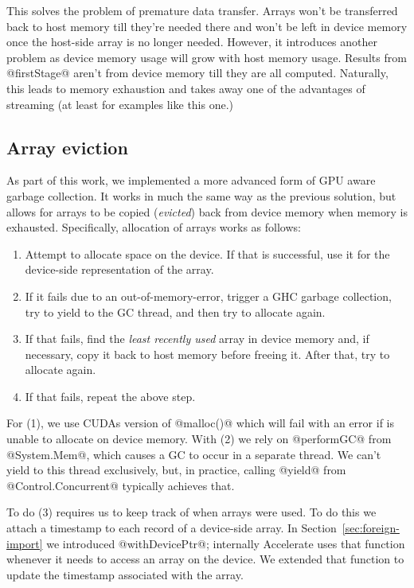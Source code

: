 This solves the problem of premature data transfer. Arrays won't be transferred back to host memory till they're needed there and won't be left in device memory once the host-side array is no longer needed. However, it introduces another problem as device memory usage will grow with host memory usage. Results from @firstStage@ aren't from device memory till they are all computed. Naturally, this leads to memory exhaustion and takes away one of the advantages of streaming (at least for examples like this one.)

\subsection{Array eviction}

As part of this work, we implemented a more advanced form of GPU aware garbage collection. It works in much the same way as the previous solution, but allows for arrays to be copied (\emph{evicted}) back from device memory when memory is exhausted. Specifically, allocation of arrays works as follows:
%
\begin{enumerate}
\item Attempt to allocate space on the device. If that is successful, use it for the device-side representation of the array.
\item If it fails due to an out-of-memory-error, trigger a GHC garbage collection, try to yield to the GC thread, and then try to allocate again.
\item If that fails, find the \emph{least recently used} array in device memory and, if necessary, copy it back to host memory before freeing it. After that, try to allocate again.
\item If that fails, repeat the above step.
\end{enumerate}
%
For (1), we use CUDAs version of @malloc()@ which will fail with an error if is unable to allocate on device memory. With (2) we rely on @performGC@ from @System.Mem@, which causes a GC to occur in a separate thread. We can't yield to this thread exclusively, but, in practice, calling @yield@ from @Control.Concurrent@ typically achieves that.

To do (3) requires us to keep track of when arrays were used. To do this we attach a timestamp to each record of a device-side array. In Section~\ref{sec:foreign-import} we introduced @withDevicePtr@; internally Accelerate uses that function whenever it needs to access an array on the device. We extended that function to update the timestamp associated with the array.


